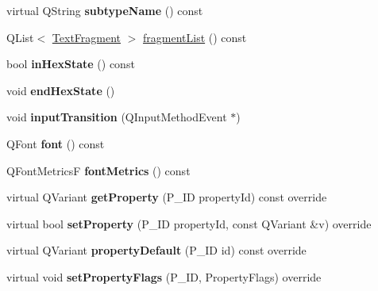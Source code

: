 \begin{DoxyCompactItemize}
virtual Q\+String {\bfseries subtype\+Name} () const
\item 
Q\+List$<$ \hyperlink{class_ms_1_1_text_fragment}{Text\+Fragment} $>$ \hyperlink{class_ms_1_1_text_a3065b94e86b14e7dcf0ee4dff467710c}{fragment\+List} () const
\item 
\mbox{\label{class_ms_1_1_text_abed355b417fe47c75613c31949520db4}} 
bool {\bfseries in\+Hex\+State} () const
\item 
\mbox{\label{class_ms_1_1_text_aa4f81d1ff10b1f34c3d571b979dfb800}} 
void {\bfseries end\+Hex\+State} ()
\item 
\mbox{\label{class_ms_1_1_text_a0c94b40bbf7989104068e83dcb837402}} 
void {\bfseries input\+Transition} (Q\+Input\+Method\+Event $\ast$)
\item 
\mbox{\label{class_ms_1_1_text_a8a6985bd14b8c4de3aca9008060389bd}} 
Q\+Font {\bfseries font} () const
\item 
\mbox{\label{class_ms_1_1_text_a688ad8b828ed72e2c7a118a5dbdd9157}} 
Q\+Font\+MetricsF {\bfseries font\+Metrics} () const
\item 
\mbox{\label{class_ms_1_1_text_a7b0ab40741b33a8c7882449ac09be558}} 
virtual Q\+Variant {\bfseries get\+Property} (P\+\_\+\+ID property\+Id) const override
\item 
\mbox{\label{class_ms_1_1_text_a0a9ec32e39c61b91fe85f8e2cc1a9da3}} 
virtual bool {\bfseries set\+Property} (P\+\_\+\+ID property\+Id, const Q\+Variant \&v) override
\item 
\mbox{\label{class_ms_1_1_text_a1376e9cab2fda4967642af7bdf48a43d}} 
virtual Q\+Variant {\bfseries property\+Default} (P\+\_\+\+ID id) const override
\item 
\mbox{\label{class_ms_1_1_text_a33c7ce782d57815ff17ffb860525fd19}} 
virtual void {\bfseries set\+Property\+Flags} (P\+\_\+\+ID, Property\+Flags) override
\item 
\mbox{\label{class_ms_1_1_text_a8321b2489c62836fbd0a59baaadd6357}} 

\end{DoxyCompactItemize}
